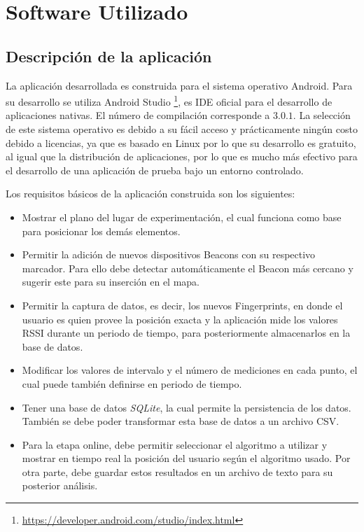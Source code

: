 \section{Software Utilizado}

\subsection{Descripción de la aplicación}

La aplicación desarrollada es construida para el sistema operativo Android. Para su desarrollo se utiliza Android Studio \footnote{\url{https://developer.android.com/studio/index.html}}, es IDE oficial para el desarrollo de aplicaciones nativas. El número de compilación corresponde a $3.0.1$. La selección de este sistema operativo es debido a su fácil acceso y prácticamente ningún costo debido a licencias, ya que es basado en Linux por lo que su desarrollo es gratuito, al igual que la distribución de aplicaciones, por lo que es mucho más efectivo para el desarrollo de una aplicación de prueba bajo un entorno controlado.

Los requisitos básicos de la aplicación construida son los siguientes:

\begin{itemize}
\item Mostrar el plano del lugar de experimentación, el cual funciona como base para posicionar los demás elementos.

\item Permitir la adición de nuevos dispositivos Beacons con su respectivo marcador. Para ello debe detectar automáticamente el Beacon más cercano y sugerir este para su inserción en el mapa.

\item Permitir la captura de datos, es decir, los nuevos Fingerprints, en donde el usuario es quien provee la posición exacta y la aplicación mide los valores RSSI durante un periodo de tiempo, para posteriormente almacenarlos en la base de datos. 

\item Modificar los valores de intervalo y el número de mediciones en cada punto, el cual puede también definirse en periodo de tiempo.

\item Tener una base de datos \textit{SQLite}, la cual permite la persistencia de los datos. También se debe poder transformar esta base de datos a un archivo CSV.

\item Para la etapa online, debe permitir seleccionar el algoritmo a utilizar y mostrar en tiempo real la posición del usuario según el algoritmo usado. Por otra parte, debe guardar estos resultados en un archivo de texto para su posterior análisis.



\end{itemize}

